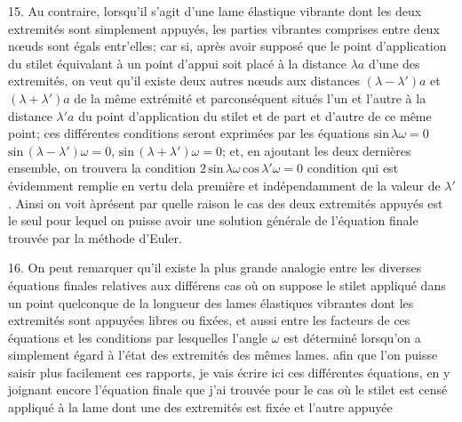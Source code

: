 \documentclass[11pt,a4paper]{article}
\begin{document}
15. Au contraire, lorsqu'il s'agit d'une lame élastique vibrante dont
les deux extremités sont simplement appuyés, les parties vibrantes comprises
entre deux nœuds sont égals entr'elles; car si, après avoir supposé que
le point d'application du stilet équivalant à un point d'appui soit
placé à la distance $\lambda a$ d'une des extremités, on veut qu'il existe
deux autres nœuds aux distances $(\lambda-\lambda')a$ et $(\lambda+\lambda')a$ de la même extrémité
et parconséquent situés l'un et l'autre à la distance $\lambda' a$ du point d'application
du stilet et de part et d'autre de ce même point; ces différentes conditions
seront exprimées par les équations $\text{sin}\,\lambda\omega = 0$ $\text{sin}\,(\lambda-\lambda')\omega = 0$, $\text{sin}\,(\lambda+\lambda')\omega = 0$;
et, en ajoutant les deux dernières ensemble, on trouvera la condition $2\,\text{sin}\,\lambda\omega\,\text{cos}\,\lambda'\omega = 0$
condition qui est évidemment remplie en vertu dela première et indépendamment
de la valeur de $\lambda'$. Ainsi on voit àprésent par quelle raison le cas des
deux extremités appuyés est le seul pour lequel on puisse avoir une solution
générale de l'équation finale trouvée par la méthode d'Euler.


16. On peut remarquer qu'il existe la plus grande analogie entre les diverses
équations finales relatives aux différens cas où on suppose le stilet appliqué
dans un point quelconque de la longueur des lames élastiques vibrantes dont
les extremités sont appuyées libres ou fixées, et aussi entre les facteurs de
ces équations et les conditions par lesquelles l'angle $\omega$ est déterminé
lorsqu'on a simplement égard à l'état des extremités des mêmes lames.
afin que l'on puisse saisir plus facilement ces rapports, je vais écrire ici
ces différentes équations, en y joignant encore l'équation finale que j'ai trouvée
pour le cas où le stilet est censé appliqué à la lame dont une des extremités
est fixée et l'autre appuyée
\end{document}

